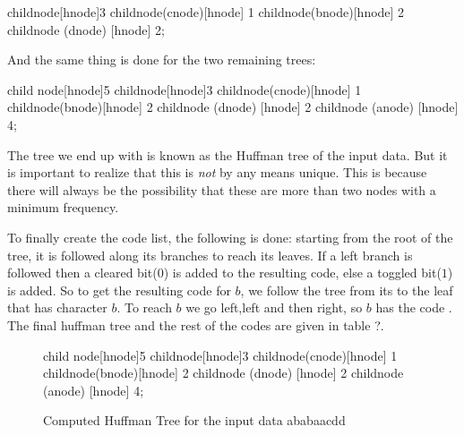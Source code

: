 \begin{huffmanc}
  child{node[hnode]{3}
    child{node(cnode)[hnode] {1}}
    child{node(bnode)[hnode] {2}}}
  child{node (dnode) [hnode] {2}};


\end{huffmanc}

And the same thing is done for the two remaining trees:

\begin{huffmanc}

  child {node[hnode]{5}
    child{node[hnode]{3}
      child{node(cnode)[hnode] {1}}
      child{node(bnode)[hnode] {2}}}
    child{node (dnode) [hnode] {2}}}
  child{node (anode) [hnode] {4}};


\end{huffmanc}

The tree we end up with is known as the Huffman tree of the input
data. But it is important to realize that this is \textit{not} by any
means unique. This is because there will always be the possibility
that these are more than two nodes with a minimum frequency.

To finally create the code list, the following is done: starting from
the root of the tree, it is followed along its branches to reach its
leaves. If a left branch is followed then a cleared bit($0$) is added
to the resulting code, else a toggled bit($1$) is added. So to get the
resulting code for $b$, we follow the tree from its to the leaf that
has character $b$. To reach $b$ we go left,left and then right, so $b$
has the code . The final huffman tree and the rest of the
codes are given in table ?.

\begin{figure}
  \centering
  \begin{huffmanc}

    child {node[hnode]{5}
      child{node[hnode]{3}
        child{node(cnode)[hnode] {1}}
        child{node(bnode)[hnode] {2}}}
      child{node (dnode) [hnode] {2}}}
    child{node (anode) [hnode] {4}};

  \end{huffmanc}

  \caption{Computed Huffman Tree for the input data ababaacdd}
  \label{fig:huff}
\end{figure}

